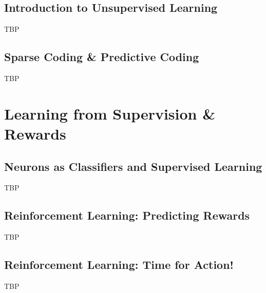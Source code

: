 \documentclass[]{article}
\begin{document}
\subsection{Introduction to Unsupervised Learning}
TBP

\subsection{Sparse Coding \& Predictive Coding}
TBP

\section{Learning from Supervision \& Rewards}\label{sec:week8}

\subsection{Neurons as Classifiers and Supervised Learning}
TBP

\subsection{Reinforcement Learning: Predicting Rewards}
TBP

\subsection{Reinforcement Learning: Time for Action!}
TBP

\appendix

\printglossaries




\end{document}
